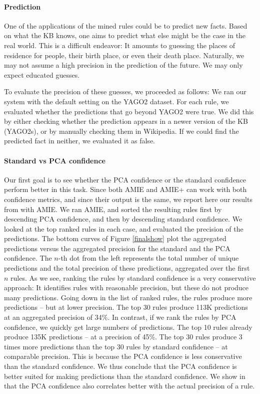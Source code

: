 \paragraph{Prediction} One of the applications of the mined rules could be to predict new facts.
Based on what the KB knows, one aims to predict what else might be the case in the real world.
This is a difficult endeavor: It amounts to guessing the places of residence for people, their birth place, or even their death place.
Naturally, we may not assume a high precision in the prediction of the future. We may only expect educated guesses.

To evaluate the precision of these guesses, we proceeded as follows:
We ran our system with the default setting on the YAGO2 dataset.
For each rule, we evaluated whether the predictions that go beyond YAGO2 were true.
We did this by either checking whether the prediction appears in a newer version of the KB (YAGO2s),
or by manually checking them in Wikipedia. If we could find the predicted fact in neither, we evaluated it as false.

\paragraph{Standard vs PCA confidence} Our first goal is to see whether the PCA confidence or the standard confidence perform better in this task.
Since both AMIE and AMIE+ can work with both confidence metrics, and since their output is the same, we report here our results from \cite{amie} with AMIE.
We ran AMIE, and sorted the resulting rules first by descending PCA confidence, and then by descending standard confidence.
We looked at the top ranked rules in each case, and evaluated the precision of the predictions.
The bottom curves of Figure \ref{finalshow} plot the aggregated predictions versus the aggregated precision for the standard and the PCA confidence.
The $n$-th dot from the left represents the total number of unique predictions and the total precision of these predictions,
aggregated over the first $n$ rules.
As we see, ranking the rules by standard confidence is a very conservative approach:
It identifies rules with reasonable precision, but these do not produce many predictions.
Going down in the list of ranked rules, the rules produce more predictions -- but at lower precision.
The top 30 rules produce 113K predictions at an aggregated precision of 34\%.
In contrast, if we rank the rules by PCA confidence, we quickly get large numbers of predictions. The top 10 rules already produce 135K predictions -- at a precision of 45\%.
The top 30 rules produce 3 times more predictions than the top 30 rules by standard confidence -- at comparable precision.
This is because the PCA confidence is less conservative than the standard confidence.
We thus conclude that the PCA confidence is better suited for making predictions than the standard confidence.
We show in \cite{amie} that the PCA confidence also correlates better with the actual precision of a rule.

